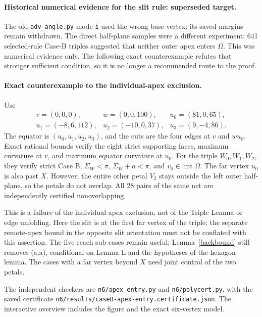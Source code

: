 \documentclass[11pt]{article}
\theoremstyle{definition}
\theoremstyle{remark}
\begin{document}
\paragraph{Historical numerical evidence for the slit rule: superseded target.}
The old \texttt{adv\_angle.py} mode \texttt{i} used the wrong base vertex;
its saved margins remain withdrawn. The direct half-plane samples were a
different experiment: 641 selected-rule Case-B triples suggested that neither
outer apex enters $\Omega$. This was numerical evidence only. The following
exact counterexample refutes that stronger sufficient condition, so it is
no longer a recommended route to the proof.

\paragraph{Exact counterexample to the individual-apex exclusion.}
Use
\[
\begin{array}{lll}
v=(0,0,0),&w=(0,0,100),&u_0=(81,0,65),\\
u_1=(-8,6,112),&u_2=(-10,0,37),&u_3=(9,-4,86).
\end{array}
\]
The equator is $(u_0,u_1,u_2,u_3)$, and the cuts are the four edges at $v$
and $wu_0$. Exact rational bounds verify the eight strict supporting faces,
maximum curvature at $v$, and maximum equator curvature at $u_0$.
For the triple $W_0,W_1,W_2$, they verify strict Case B, $\Sigma_W<\pi$,
$\Sigma_W+a<\pi$, and $v_0\in\operatorname{int}\Omega$.
The far vertex $u_0$ is also past $X$. However, the entire other petal $V_2$
stays outside the left outer half-plane, so the petals do not overlap.
All 28 pairs of the same net are independently certified nonoverlapping.

This is a failure of the individual-apex exclusion, not of the Triple Lemma
or edge unfolding. Here the slit is at the first far vertex of the triple;
the separate remote-apex bound in the opposite slit orientation must not be
conflated with this assertion. The five reach sub-cases remain useful;
Lemma~\ref{backbound} still removes (a,a), conditional on Lemma L and the
hypotheses of the hexagon lemma. The cases with a far vertex beyond $X$
need joint control of the two petals.

The independent checkers are \texttt{n6/apex\_entry.py} and
\texttt{n6/polycert.py}, with the saved certificate
\texttt{n6/results/caseB-apex-entry.certificate.json}. The interactive overview
includes the figure and the exact six-vertex model.
\end{document}
